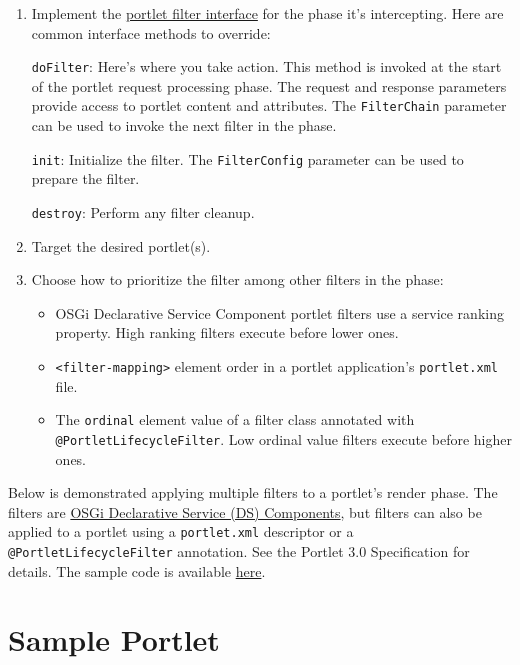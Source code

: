 \begin{enumerate}
\def\labelenumi{\arabic{enumi}.}
\item
  Implement the
  \href{http://docs.liferay.com/portlet-api/3.0/javadocs/javax/portlet/filter/package-frame.html}{portlet
  filter interface} for the phase it's intercepting. Here are common
  interface methods to override:

  \texttt{doFilter}: Here's where you take action. This method is
  invoked at the start of the portlet request processing phase. The
  request and response parameters provide access to portlet content and
  attributes. The \texttt{FilterChain} parameter can be used to invoke
  the next filter in the phase.

  \texttt{init}: Initialize the filter. The \texttt{FilterConfig}
  parameter can be used to prepare the filter.

  \texttt{destroy}: Perform any filter cleanup.
\item
  Target the desired portlet(s).
\item
  Choose how to prioritize the filter among other filters in the phase:

  \begin{itemize}
  \tightlist
  \item
    OSGi Declarative Service Component portlet filters use a service
    ranking property. High ranking filters execute before lower ones.
  \item
    \texttt{\textless{}filter-mapping\textgreater{}} element order in a
    portlet application's \texttt{portlet.xml} file.
  \item
    The \texttt{ordinal} element value of a filter class annotated with
    \texttt{@PortletLifecycleFilter}. Low ordinal value filters execute
    before higher ones.
  \end{itemize}
\end{enumerate}

Below is demonstrated applying multiple filters to a portlet's render
phase. The filters are
\href{/docs/7-2/frameworks/-/knowledge_base/f/declarative-services}{OSGi
Declarative Service (DS) Components}, but filters can also be applied to
a portlet using a \texttt{portlet.xml} descriptor or a
\texttt{@PortletLifecycleFilter} annotation. See the Portlet 3.0
Specification for details. The sample code is available
\href{https://portal.liferay.dev/learn/code-samples/-/cs/list/7.2/java8/workspace-gradle/modules/applications/portlets/render-filter-portlet}{here}.

\section{Sample Portlet}\label{sample-portlet}

